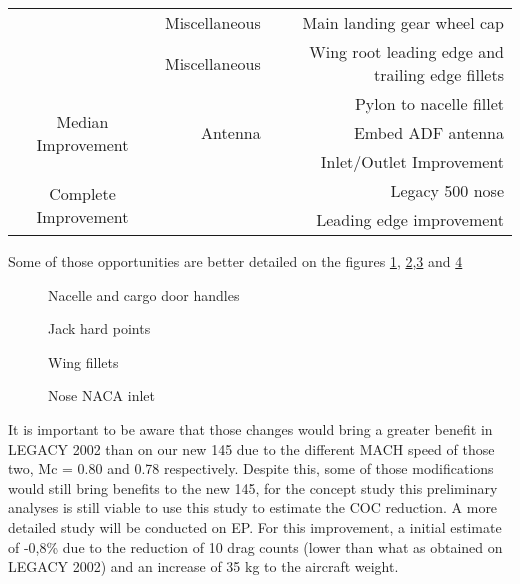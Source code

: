 \begin{table}[htbp]
\begin{tabular}{crr}
          & Miscellaneous & Main landing gear wheel cap \\
          & Miscellaneous & Wing root leading edge and trailing edge fillets \\
    \multirow{3}[6]{*}{Median Improvement} &       & Pylon to nacelle fillet \\
          & Antenna & Embed ADF antenna \\
          &       & Inlet/Outlet Improvement \\
    \multirow{2}[4]{*}{Complete Improvement} &       & Legacy 500 nose \\
          &       & Leading edge improvement \\
    \bottomrule
    \end{tabular}%
  \label{tab:simpleaerodinamicchanges}%
\end{table}%

Some of those opportunities are better detailed on the figures \ref{fig:Nacelleandcargodoorhandles}, \ref{fig:Jackhardpoints},\ref{fig:Wingfillets} and \ref{fig:NoseNACAinlet}

\begin{figure}[H] %
\caption{Nacelle and cargo door handles}
\label{fig:Nacelleandcargodoorhandles}
\end{figure}

\begin{figure}[H] %
\caption{Jack hard points}
\label{fig:Jackhardpoints}
\end{figure}

\begin{figure}[H] %
\caption{Wing fillets}
\label{fig:Wingfillets}
\end{figure}

\begin{figure}[H] %
\caption{Nose NACA inlet}
\label{fig:NoseNACAinlet}
\end{figure}

It is important to be aware that those changes would bring a greater benefit in LEGACY 2002 than on our new 145 due to the different MACH speed of those two, Mc = 0.80 and 0.78 respectively. Despite this, some of those modifications would still bring benefits to the new 145, for the concept study this preliminary analyses is still viable to use this study to estimate the COC reduction. A more detailed study will be conducted on EP.
For this improvement, a initial estimate of -0,8\% due to the reduction of 10 drag counts (lower than what as obtained on LEGACY 2002) and an increase of 35 kg to the aircraft weight.


